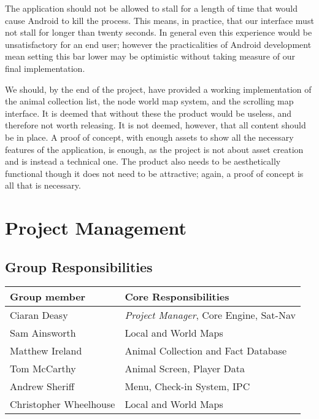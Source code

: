 \documentclass[12pt,a4paper,twoside]{article}
\begin{document}
The application should not be allowed to stall for a length of time that would cause Android to kill the process.
This means, in practice, that our interface must not stall for longer than twenty seconds.
In general even this experience would be unsatisfactory for an end user; however the practicalities of Android development mean setting this bar lower may be optimistic without taking measure of our final implementation.

We should, by the end of the project, have provided a working implementation of the animal collection list, the node world map system, and the scrolling map interface.
It is deemed that without these the product would be useless, and therefore not worth releasing.
It is not deemed, however, that all content should be in place.
A proof of concept, with enough assets to show all the necessary features of the application, is enough, as the project is not about asset creation and is instead a technical one.
The product also needs to be aesthetically functional though it does not need to be attractive; again, a proof of concept is all that is necessary.

\section{Project Management}
\subsection{Group Responsibilities}
\setlength{\extrarowheight}{5pt}
\begin{tabular}{|m{5.5cm}|m{9.5cm}|}
\hline
\textbf{Group member} & \textbf{Core Responsibilities}\\
\hline
Ciaran Deasy           & \emph{Project Manager}, Core Engine, Sat-Nav\\
\hline
Sam Ainsworth          & Local and World Maps\\
\hline
Matthew Ireland        & Animal Collection and Fact Database\\
\hline
Tom McCarthy           & Animal Screen, Player Data\\
\hline
Andrew Sheriff         & Menu, Check-in System, IPC\\
\hline
Christopher Wheelhouse & Local and World Maps\\
\hline
\end{tabular}
\end{document}

